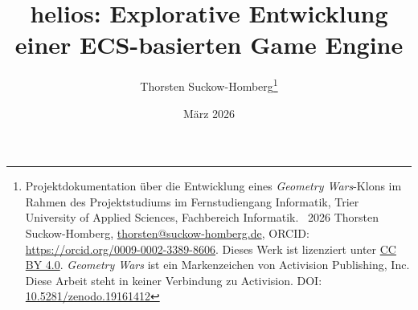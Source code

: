 \documentclass[a4paper,abstract=true]{scrreprt}
\begin{document}
    \title{helios: Explorative Entwicklung einer ECS-basierten Game Engine}

    \author{
        Thorsten Suckow-Homberg\thanks{%
            Projektdokumentation über die Entwicklung eines \textit{Geometry Wars}-Klons im Rahmen des Projektstudiums im Fernstudiengang Informatik,
            Trier University of Applied Sciences, Fachbereich Informatik.
            \newline
            \textcopyright\ 2026 Thorsten Suckow-Homberg, \href{mailto:thorsten@suckow-homberg.de}{thorsten@suckow-homberg.de},
            ORCID: \url{https://orcid.org/0009-0002-3389-8606}.
            Dieses Werk ist lizenziert unter
            \href{https://creativecommons.org/licenses/by/4.0/}{CC BY 4.0}.
            \newline
            \textit{Geometry Wars} ist ein Markenzeichen von Activision Publishing, Inc.
            Diese Arbeit steht in keiner Verbindung zu Activision.
            \newline
            DOI: \href{https://doi.org/10.5281/zenodo.19161412}{10.5281/zenodo.19161412}
        }%
    }

    \date{März 2026}


    \maketitle



    \tableofcontents


    

    \clearpage
    \sloppy
    \printbibliography
    \fussy
\end{document}
